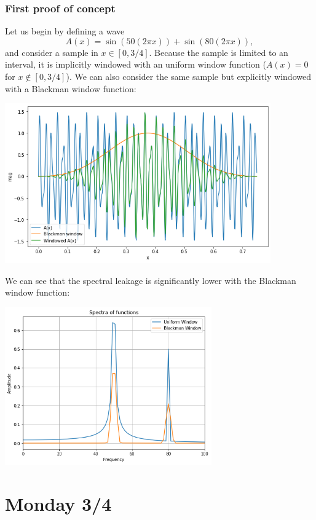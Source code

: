 \documentclass{article}
\begin{document}
    \subsubsection*{First proof of concept}
    \noindent Let us begin by defining a wave
    $$A(x) = \sin(50(2\pi x)) + \sin(80(2\pi x)),$$
    and consider a sample in $x \in [0, 3/4].$ Because the sample is limited to an interval, it is implicitly windowed with an uniform window function ($A(x) = 0$ for $x \notin [0, 3/4]$). We can also consider the same sample but explicitly windowed with a Blackman window function:
    \begin{mdframed}[backgroundcolor=gray!20, align = center, userdefinedwidth = 4.8in]
    \includegraphics[width = 4.5in]{img/window_function_plot.png}
    \end{mdframed}
    We can see that the spectral leakage is significantly lower with the Blackman window function:
    \begin{mdframed}[backgroundcolor=gray!20, align = center, userdefinedwidth = 3.8in]
    \includegraphics[width = 3.5in]{img/WindowedLeakage.png}
    \end{mdframed}
    \newpage
    \section*{Monday 3/4}
\end{document}
